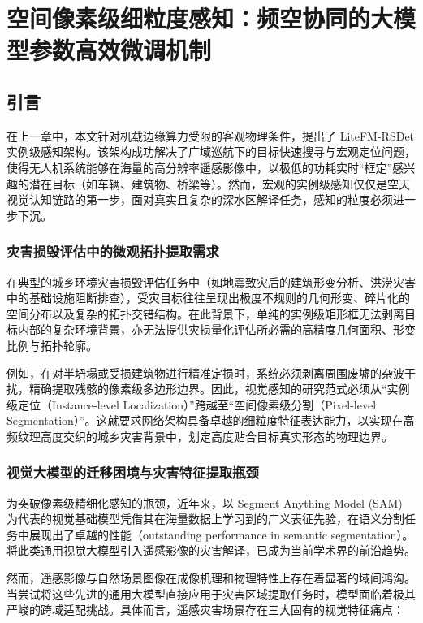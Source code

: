 \chapter{空间像素级细粒度感知：频空协同的大模型参数高效微调机制}

\section{引言}
在上一章中，本文针对机载边缘算力受限的客观物理条件，提出了 LiteFM-RSDet 实例级感知架构。该架构成功解决了广域巡航下的目标快速搜寻与宏观定位问题，使得无人机系统能够在海量的高分辨率遥感影像中，以极低的功耗实时“框定”感兴趣的潜在目标（如车辆、建筑物、桥梁等）。然而，宏观的实例级感知仅仅是空天视觉认知链路的第一步，面对真实且复杂的深水区解译任务，感知的粒度必须进一步下沉。

\subsection{灾害损毁评估中的微观拓扑提取需求}
在典型的城乡环境灾害损毁评估任务中（如地震致灾后的建筑形变分析、洪涝灾害中的基础设施阻断排查），受灾目标往往呈现出极度不规则的几何形变、碎片化的空间分布以及复杂的拓扑交错结构。在此背景下，单纯的实例级矩形框无法剥离目标内部的复杂环境背景，亦无法提供灾损量化评估所必需的高精度几何面积、形变比例与拓扑轮廓。

例如，在对半坍塌或受损建筑物进行精准定损时，系统必须剥离周围废墟的杂波干扰，精确提取残骸的像素级多边形边界。因此，视觉感知的研究范式必须从“实例级定位（Instance-level Localization）”跨越至“空间像素级分割（Pixel-level Segmentation）”。这就要求网络架构具备卓越的细粒度特征表达能力，以实现在高频纹理高度交织的城乡灾害背景中，划定高度贴合目标真实形态的物理边界。

\subsection{视觉大模型的迁移困境与灾害特征提取瓶颈}
为突破像素级精细化感知的瓶颈，近年来，以 Segment Anything Model (SAM) 为代表的视觉基础模型凭借其在海量数据上学习到的广义表征先验，在语义分割任务中展现出了卓越的性能（outstanding performance in semantic segmentation）。将此类通用视觉大模型引入遥感影像的灾害解译，已成为当前学术界的前沿趋势。

然而，遥感影像与自然场景图像在成像机理和物理特性上存在着显著的域间鸿沟。当尝试将这些先进的通用大模型直接应用于灾害区域提取任务时，模型面临着极其严峻的跨域适配挑战。具体而言，遥感灾害场景存在三大固有的视觉特征痛点：

